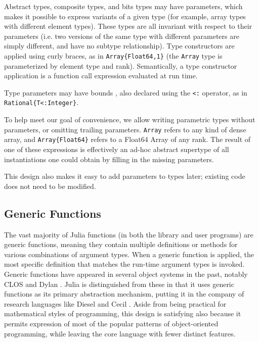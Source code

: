 \documentclass[9pt]{sigplanconf}
\begin{document}
Abstract types, composite types, and bits types may have parameters, which
makes it possible to express variants of a given type (for example, array types
with different element types). These types are all invariant with respect to
their parameters (i.e. two versions of the same type with different parameters
are simply different, and have no subtype relationship). Type
constructors are applied using curly braces, as in {\tt Array\{Float64,1\}}
(the {\tt Array} type is parameterized by element type and rank).
Semantically, a type constructor application is a function call expression
evaluated at run time.

Type parameters may have bounds \cite{boundedquant}, also declared using
the {\tt <:} operator, as in {\tt Rational\{T<:Integer\}}.

To help meet our goal of convenience, we allow writing
parametric types without parameters, or omitting trailing parameters.
{\tt Array} refers to any kind of dense array, and {\tt Array\{Float64\}}
refers to a Float64 Array of any rank.
The result of one of these expressions is effectively an ad-hoc abstract
supertype of all instantiations one could obtain by filling in the missing
parameters.

This design also makes it easy to add parameters to types later; existing
code does not need to be modified.


\subsection{Generic Functions}

The vast majority of Julia functions (in both the library and user programs)
are generic functions, meaning they contain multiple definitions or methods for
various combinations of argument types. When a generic function is applied,
the most specific definition that matches the run-time argument types is
invoked. Generic functions have appeared in several object systems in the past,
notably CLOS \cite{closoverview} and Dylan \cite{dylanlang}.
Julia is distinguished from these in that
it uses generic functions as its primary abstraction mechanism, putting it in
the company of research languages like Diesel \cite{dieselspec} and Cecil
\cite{cecil}. Aside
from being practical for mathematical styles of programming,
this design is satisfying also because it permits
expression of most of the popular patterns of object-oriented programming,
while leaving the core language with fewer distinct features.
\end{document}
